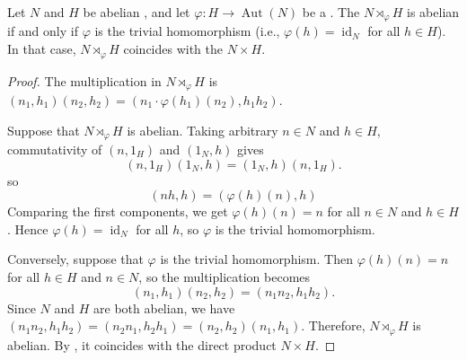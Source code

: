 \begin{proposition} \label{proposition:semidirect_product_of_abelian_groups_is_abelian_iff_trivial_action}
    Let $N$ and $H$ be abelian , and let $\varphi: H \to \operatorname{Aut}(N)$ be a . The  $N \rtimes_\varphi H$ is abelian if and only if $\varphi$ is the trivial homomorphism (i.e., $\varphi(h) = \operatorname{id}_N$ for all $h \in H$). In that case, $N \rtimes_\varphi H$ coincides with the  $N \times H$.
\end{proposition}

\begin{proof}
    The multiplication in $N \rtimes_\varphi H$ is $(n_1, h_1)(n_2, h_2) = (n_1 \cdot \varphi(h_1)(n_2), h_1 h_2)$.

    Suppose that $N \rtimes_\varphi H$ is abelian. Taking arbitrary $n \in N$ and $h \in H$, commutativity of $(n, 1_H)$ and $(1_N, h)$ gives
    $$(n, 1_H)(1_N, h) =  (1_N, h)(n, 1_H).$$
    so
    $$(nh, h) = (\varphi(h)(n), h)$$
    Comparing the first components, we get $\varphi(h)(n) = n$ for all $n \in N$ and $h \in H$. Hence $\varphi(h) = \operatorname{id}_N$ for all $h$, so $\varphi$ is the trivial homomorphism.

    Conversely, suppose that $\varphi$ is the trivial homomorphism. Then $\varphi(h)(n) = n$ for all $h \in H$ and $n \in N$, so the multiplication becomes
    $$(n_1, h_1)(n_2, h_2) = (n_1 n_2, h_1 h_2).$$
    Since $N$ and $H$ are both abelian, we have $(n_1 n_2, h_1 h_2) = (n_2 n_1, h_2 h_1) = (n_2, h_2)(n_1, h_1)$. Therefore, $N \rtimes_\varphi H$ is abelian. By , it coincides with the direct product $N \times H$.
\end{proof}
